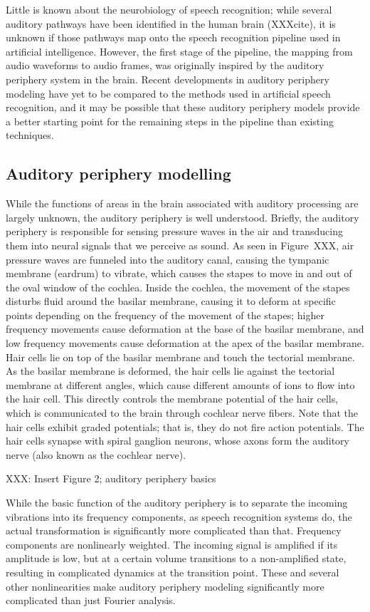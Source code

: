 \documentclass{article}
\begin{document}
Little is known about the neurobiology
of speech recognition;
while several auditory pathways have been identified
in the human brain (XXXcite),
it is unknown if those pathways map onto
the speech recognition pipeline
used in artificial intelligence.
However, the first stage of the pipeline,
the mapping from audio waveforms
to audio frames, was originally inspired
by the auditory periphery system
in the brain.
Recent developments in auditory periphery modeling
have yet to be compared to the methods used
in artificial speech recognition,
and it may be possible that
these auditory periphery models
provide a better starting point
for the remaining steps in the pipeline
than existing techniques.

\subsection{Auditory periphery modelling}

While the functions of areas in the brain
associated with auditory processing
are largely unknown,
the auditory periphery is well understood.
Briefly, the auditory periphery
is responsible for sensing pressure waves
in the air and transducing them into
neural signals that we perceive as sound.
As seen in Figure~XXX,
air pressure waves are funneled into the auditory canal,
causing the tympanic membrane (eardrum)
to vibrate, which causes the stapes
to move in and out of the oval window of the cochlea.
Inside the cochlea, the movement of the stapes
disturbs fluid around the basilar membrane,
causing it to deform at specific points
depending on the frequency of the movement
of the stapes; higher frequency movements
cause deformation at the base of the basilar membrane,
and low frequency movements cause deformation
at the apex of the basilar membrane.
Hair cells lie on top of the basilar membrane
and touch the tectorial membrane.
As the basilar membrane is deformed,
the hair cells lie against
the tectorial membrane at different angles,
which cause different amounts of ions
to flow into the hair cell.
This directly controls the membrane potential
of the hair cells,
which is communicated
to the brain through cochlear nerve fibers.
Note that the hair cells exhibit graded potentials;
that is, they do not fire action potentials.
The hair cells synapse with spiral ganglion neurons,
whose axons form the auditory nerve
(also known as the cochlear nerve).

XXX: Insert Figure 2; auditory periphery basics

While the basic function of the auditory periphery
is to separate the incoming vibrations
into its frequency components,
as speech recognition systems do,
the actual transformation is significantly
more complicated than that.
Frequency components are nonlinearly weighted.
The incoming signal is amplified
if its amplitude is low,
but at a certain volume transitions
to a non-amplified state,
resulting in complicated dynamics
at the transition point.
These and several other nonlinearities
make auditory periphery modeling
significantly more complicated
than just Fourier analysis.
\end{document}
